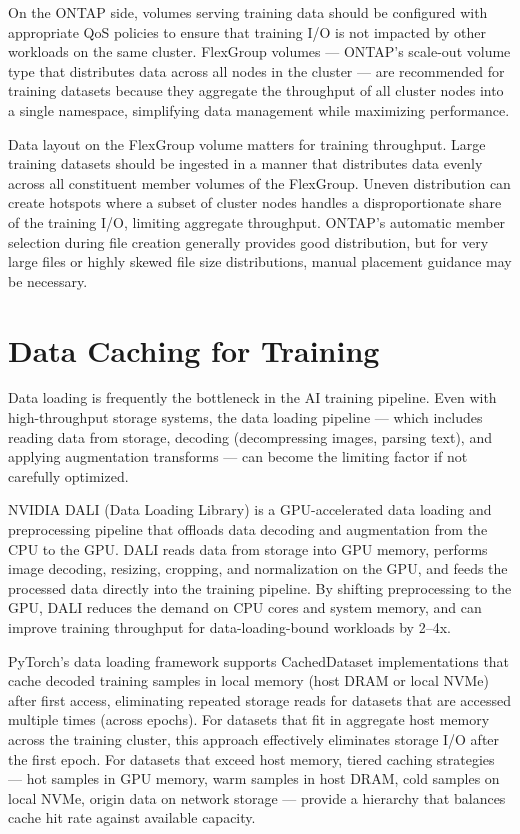 On the ONTAP side, volumes serving training data should be configured with
appropriate QoS policies to ensure that training I/O is not impacted by other
workloads on the same cluster. FlexGroup volumes --- ONTAP's scale-out volume
type that distributes data across all nodes in the cluster --- are recommended
for training datasets because they aggregate the throughput of all cluster
nodes into a single namespace, simplifying data management while maximizing
performance.

Data layout on the FlexGroup volume matters for training throughput. Large
training datasets should be ingested in a manner that distributes data evenly
across all constituent member volumes of the FlexGroup. Uneven distribution
can create hotspots where a subset of cluster nodes handles a disproportionate
share of the training I/O, limiting aggregate throughput. ONTAP's automatic
member selection during file creation generally provides good distribution,
but for very large files or highly skewed file size distributions, manual
placement guidance may be necessary.

\section{Data Caching for Training}

Data loading is frequently the bottleneck in the AI training pipeline. Even
with high-throughput storage systems, the data loading pipeline --- which
includes reading data from storage, decoding (decompressing images, parsing
text), and applying augmentation transforms --- can become the limiting factor
if not carefully optimized.

NVIDIA DALI (Data Loading Library) is a GPU-accelerated data loading and
preprocessing pipeline that offloads data decoding and augmentation from the
CPU to the GPU. DALI reads data from storage into GPU memory, performs image
decoding, resizing, cropping, and normalization on the GPU, and feeds the
processed data directly into the training pipeline. By shifting preprocessing
to the GPU, DALI reduces the demand on CPU cores and system memory, and can
improve training throughput for data-loading-bound workloads by 2--4x.

PyTorch's data loading framework supports CachedDataset implementations that
cache decoded training samples in local memory (host DRAM or local NVMe)
after first access, eliminating repeated storage reads for datasets that are
accessed multiple times (across epochs). For datasets that fit in aggregate
host memory across the training cluster, this approach effectively eliminates
storage I/O after the first epoch. For datasets that exceed host memory,
tiered caching strategies --- hot samples in GPU memory, warm samples in host
DRAM, cold samples on local NVMe, origin data on network storage --- provide a
hierarchy that balances cache hit rate against available capacity.

